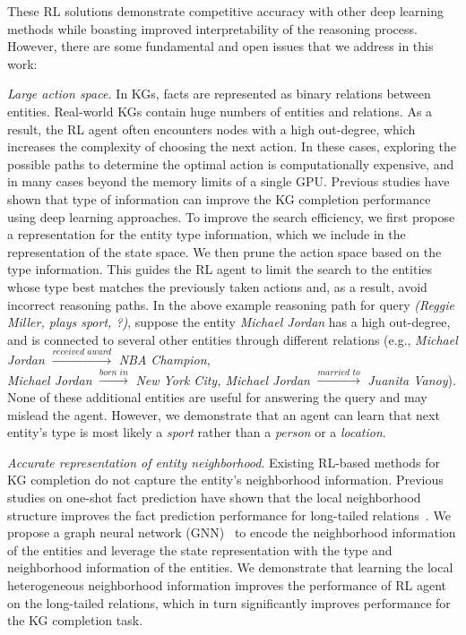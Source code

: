 These RL solutions demonstrate competitive accuracy with other deep learning methods while boasting improved interpretability of the reasoning process. However, there are some fundamental and open issues that we address in this work:
    \par {\em Large action space.} In KGs, facts are represented as binary relations between entities. Real-world KGs contain huge numbers of entities and relations. As a result, the RL agent often encounters nodes with a high out-degree, which increases the complexity of choosing the next action. In these cases, exploring the possible paths to determine the optimal action is computationally expensive, and in many cases beyond the memory limits of a single GPU. Previous studies have shown that type of information can improve the KG completion performance~\cite{shen2020modeling,lei2019path} using deep learning approaches. To improve the search efficiency, we first propose a representation for the entity type information, which we include in the representation of the state space. We then prune the action space based on the type information. This guides the RL agent to limit the search to the entities whose type best matches the previously taken actions and, as a result, avoid incorrect reasoning paths. In the above example reasoning path for query \textit{(Reggie Miller, plays sport, ?)}, suppose the entity \textit{Michael Jordan} has a high out-degree, and is connected to several other entities through different relations (e.g., \textit{Michael Jordan} $\xrightarrow{\textit{received award}}$ \textit{NBA Champion},\\ \textit{Michael Jordan} $\xrightarrow{\textit{born in}}$ \textit{New York City, Michael Jordan} $\xrightarrow{\textit{married to}}$ \textit{Juanita Vanoy}). None of these additional entities are useful for answering the query and may mislead the agent. However, we demonstrate that an agent can learn that next entity's type is most likely a \textit{sport} rather than a \textit{person} or a \textit{location}. 

    
    
    \par {\em Accurate representation of entity neighborhood}. Existing RL-based methods for KG completion do not capture the entity's neighborhood information. Previous studies on one-shot fact prediction have shown that the local neighborhood structure improves the fact prediction performance for long-tailed relations~\cite{xiong2018one,zhang2019few}. We propose a graph neural network (GNN)~\cite{kipf2016semi} to encode the neighborhood information of the entities and leverage the state representation with the type and neighborhood information of the entities. We demonstrate that learning the local heterogeneous neighborhood information improves the performance of RL agent on the long-tailed relations, which in turn significantly improves performance for the KG completion task. %
    
